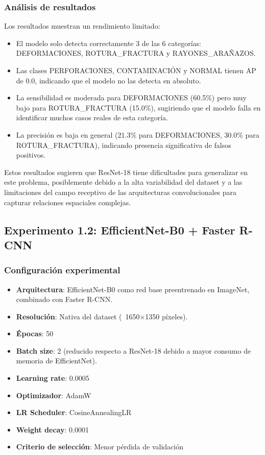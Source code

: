 \subsubsection{Análisis de resultados}

Los resultados muestran un rendimiento limitado:

\begin{itemize}
    \item El modelo solo detecta correctamente 3 de las 6 categorías: DEFORMACIONES, \mbox{ROTURA\_FRACTURA} y \mbox{RAYONES\_ARAÑAZOS}.
    \item Las clases PERFORACIONES, CONTAMINACIÓN y NORMAL tienen AP de 0.0, indicando que el modelo no las detecta en absoluto.
    \item La sensibilidad es moderada para DEFORMACIONES (60.5\%) pero muy bajo para \mbox{ROTURA\_FRACTURA} (15.0\%), sugiriendo que el modelo falla en identificar muchos casos reales de esta categoría.
    \item La precisión es baja en general (21.3\% para DEFORMACIONES, 30.0\% para \mbox{ROTURA\_FRACTURA}), indicando presencia significativa de falsos positivos.
\end{itemize}

Estos resultados sugieren que ResNet-18 tiene dificultades para generalizar en este problema, posiblemente debido a la alta variabilidad del dataset y a las limitaciones del campo receptivo de las arquitecturas convolucionales para capturar relaciones espaciales complejas.

\subsection{Experimento 1.2: EfficientNet-B0 + Faster R-CNN}

\subsubsection{Configuración experimental}

\begin{itemize}
    \item \textbf{Arquitectura}: EfficientNet-B0 como red base preentrenado en ImageNet, combinado con Faster R-CNN.
    \item \textbf{Resolución}: Nativa del dataset (~1650×1350 píxeles).
    \item \textbf{Épocas}: 50
    \item \textbf{Batch size}: 2 (reducido respecto a ResNet-18 debido a mayor consumo de memoria de EfficientNet).
    \item \textbf{Learning rate}: 0.0005
    \item \textbf{Optimizador}: AdamW
    \item \textbf{LR Scheduler}: CosineAnnealingLR
    \item \textbf{Weight decay}: 0.0001
    \item \textbf{Criterio de selección}: Menor pérdida de validación
\end{itemize}

